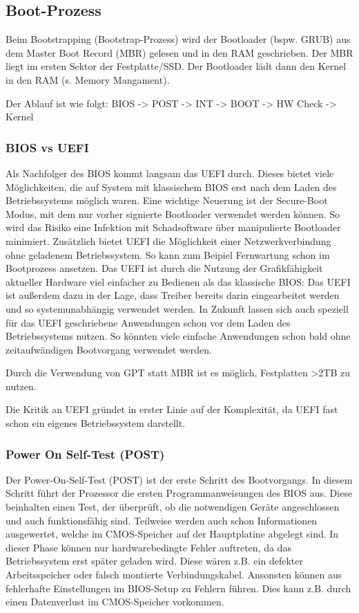 
\subsection{Boot-Prozess}
Beim Bootstrapping (Bootstrap-Prozess) wird der Bootloader (bspw. GRUB) aus dem Master Boot Record (MBR) gelesen und in den RAM geschrieben. Der MBR liegt im ersten Sektor der Festplatte/SSD. Der Bootloader lädt dann den Kernel in den RAM (s. Memory Mangament).

Der Ablauf ist wie folgt: BIOS -> POST -> INT -> BOOT -> HW Check -> Kernel

\subsubsection{BIOS vs UEFI}
Als Nachfolger des BIOS kommt langsam das UEFI durch. Dieses bietet viele Möglichkeiten, die auf System mit klassischem BIOS erst nach dem Laden des Betriebssystems möglich waren. Eine wichtige Neuerung ist der Secure-Boot Modus, mit dem nur vorher signierte Bootloader verwendet werden können. So wird das Risiko eine Infektion mit Schadsoftware über manipulierte Bootloader minimiert. Zusätzlich bietet UEFI die Möglichkeit einer Netzwerkverbindung ohne geladenem Betriebssystem. So kann zum Beipiel Fernwartung schon im Bootprozess ansetzen. Das UEFI ist durch die Nutzung der Grafikfähigkeit aktueller Hardware viel einfacher zu Bedienen als das klassische BIOS: Das UEFI ist außerdem dazu in der Lage, dass Treiber bereits darin eingearbeitet werden und so systemunabhängig verwendet werden. In Zukunft lassen sich auch speziell für das UEFI geschriebene Anwendungen schon vor dem Laden des Betriebssystems nutzen. So könnten viele einfache Anwendungen schon bald ohne zeitaufwändigen Bootvorgang verwendet werden.

Durch die Verwendung von GPT statt MBR ist es möglich, Festplatten >2TB zu nutzen.

Die Kritik an UEFI gründet in erster Linie auf der Komplexität, da UEFI fast schon ein eigenes Betriebssystem darstellt.

\subsubsection{Power On Self-Test (POST)}
Der Power-On-Self-Test (POST) ist der erste Schritt des Bootvorgangs. In diesem Schritt führt der Prozessor die ersten Programmanweisungen des BIOS aus. Diese beinhalten einen Test, der überprüft, ob die notwendigen Geräte angeschlossen und auch funktionsfähig sind.  Teilweise werden auch schon Informationen ausgewertet, welche im CMOS-Speicher auf der Hauptplatine abgelegt sind. In dieser Phase können nur hardwarebedingte Fehler auftreten, da das Betriebssystem erst später geladen wird.  Diese wären z.B. ein defekter Arbeitsspeicher oder falsch montierte Verbindungskabel.  Ansonsten können aus fehlerhafte Einstellungen im BIOS-Setup zu Fehlern führen. Dies kann z.B. durch einen Datenverlust im CMOS-Speicher vorkommen.

